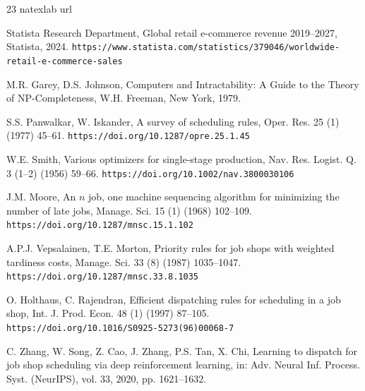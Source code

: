 \documentclass[3p,times]{elsarticle}
\begin{document}


\begin{thebibliography}{23}
\expandafter\ifx\csname natexlab\endcsname\relax
  \def\natexlab#1{#1}\fi
\expandafter\ifx\csname url\endcsname\relax
  \def\url#1{\texttt{#1}}\fi

Statista Research Department,
Global retail e-commerce revenue 2019--2027,
Statista, 2024.
\newline\url{https://www.statista.com/statistics/379046/worldwide-retail-e-commerce-sales}

M.R. Garey, D.S. Johnson,
Computers and Intractability: A Guide to the Theory of
  NP-Completeness,
W.H. Freeman, New York, 1979.

S.S. Panwalkar, W. Iskander,
A survey of scheduling rules,
Oper. Res. 25 (1) (1977) 45--61.
\newline\url{https://doi.org/10.1287/opre.25.1.45}

W.E. Smith,
Various optimizers for single-stage production,
Nav. Res. Logist. Q. 3 (1--2) (1956) 59--66.
\newline\url{https://doi.org/10.1002/nav.3800030106}

J.M. Moore,
An $n$ job, one machine sequencing algorithm for minimizing
  the number of late jobs,
Manage. Sci. 15 (1) (1968) 102--109.
\newline\url{https://doi.org/10.1287/mnsc.15.1.102}

A.P.J. Vepsalainen, T.E. Morton,
Priority rules for job shops with weighted tardiness costs,
Manage. Sci. 33 (8) (1987) 1035--1047.
\newline\url{https://doi.org/10.1287/mnsc.33.8.1035}

O. Holthaus, C. Rajendran,
Efficient dispatching rules for scheduling in a job shop,
Int. J. Prod. Econ. 48 (1) (1997) 87--105.
\newline\url{https://doi.org/10.1016/S0925-5273(96)00068-7}

C. Zhang, W. Song, Z. Cao, J. Zhang, P.S. Tan, X. Chi,
Learning to dispatch for job shop scheduling via deep
  reinforcement learning,
in: Adv. Neural Inf. Process. Syst. (NeurIPS), vol. 33,
  2020, pp. 1621--1632.


\end{thebibliography}
\end{document}
